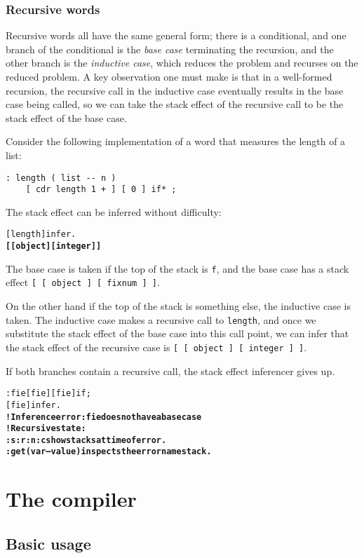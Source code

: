 \documentclass{book}
\begin{document}
\subsection{Recursive words}

Recursive words all have the same general form; there is a conditional, and one branch of the conditional is the \emph{base case} terminating the recursion, and the other branch is the \emph{inductive case}, which reduces the problem and recurses on the reduced problem. A key observation one must make is that in a well-formed recursion, the recursive call in the inductive case eventually results in the base case being called, so we can take the stack effect of the recursive call to be the stack effect of the base case.

Consider the following implementation of a word that measures the length of a list:
\begin{verbatim}
: length ( list -- n )
    [ cdr length 1 + ] [ 0 ] if* ;
\end{verbatim}
The stack effect can be inferred without difficulty:
\begin{alltt}
  [ length ] infer .
\textbf{[ [ object ] [ integer ] ]}
\end{alltt}
The base case is taken if the top of the stack is \verb|f|, and the base case has a stack effect \verb|[ [ object ] [ fixnum ] ]|.

On the other hand if the top of the stack is something else, the inductive case is taken. The inductive case makes a recursive call to \verb|length|, and once we substitute the stack effect of the base case into this call point, we can infer that the stack effect of the recursive case is \verb|[ [ object ] [ integer ] ]|.

If both branches contain a recursive call, the stack effect inferencer gives up.
\begin{alltt}
  : fie [ fie ] [ fie ] if ;
  [ fie ] infer .
\textbf{! Inference error: fie does not have a base case
! Recursive state:
:s :r :n :c show stacks at time of error.
:get ( var -- value ) inspects the error namestack.}
\end{alltt}

\chapter{The compiler}\label{compiler}

\section{Basic usage}
\end{document}
